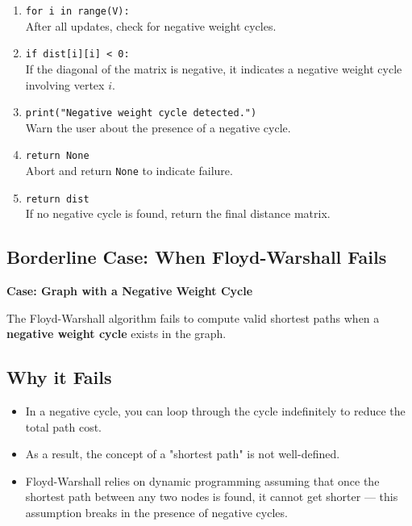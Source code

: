 \documentclass[14pt,a4paper]{extarticle}
\begin{document}
\begin{enumerate}[leftmargin=2em]
    \item \texttt{for i in range(V):} \\
    After all updates, check for negative weight cycles.

    \item \texttt{if dist[i][i] < 0:} \\
    If the diagonal of the matrix is negative, it indicates a negative weight cycle involving vertex \(i\).

    \item \texttt{print("Negative weight cycle detected.")} \\
    Warn the user about the presence of a negative cycle.

    \item \texttt{return None} \\
    Abort and return \texttt{None} to indicate failure.

    \item \texttt{return dist} \\
    If no negative cycle is found, return the final distance matrix.
\end{enumerate}

\subsection{Borderline Case: When Floyd-Warshall Fails}

\textbf{Case: Graph with a Negative Weight Cycle}

The Floyd-Warshall algorithm fails to compute valid shortest paths when a \textbf{negative weight cycle} exists in the graph.

\subsection*{Why it Fails}
\begin{itemize}[leftmargin=2em]
    \item In a negative cycle, you can loop through the cycle indefinitely to reduce the total path cost.
    \item As a result, the concept of a "shortest path" is not well-defined.
    \item Floyd-Warshall relies on dynamic programming assuming that once the shortest path between any two nodes is found, it cannot get shorter — this assumption breaks in the presence of negative cycles.
\end{itemize}
\end{document}
